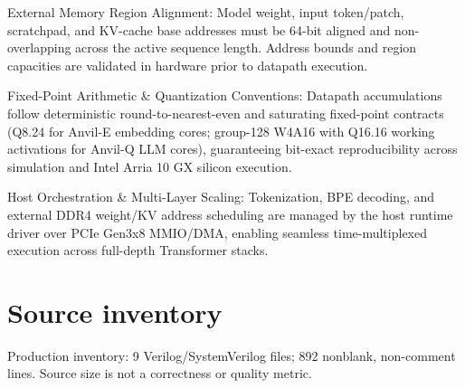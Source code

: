 \documentclass[11pt,a4paper]{article}
\begin{document}
External Memory Region Alignment: Model weight,\allowbreak{} input token/\allowbreak{}patch,\allowbreak{} scratchpad,\allowbreak{} and KV-cache base addresses must be 64-bit aligned and non-overlapping across the active sequence length. Address bounds and region capacities are validated in hardware prior to datapath execution.


Fixed-Point Arithmetic \& Quantization Conventions: Datapath accumulations follow deterministic round-to-nearest-even and saturating fixed-point contracts (\allowbreak{}Q8.24 for Anvil-E embedding cores; group-128 W4A16 with Q16.16 working activations for Anvil-Q LLM cores)\allowbreak{},\allowbreak{} guaranteeing bit-exact reproducibility across simulation and Intel Arria 10 GX silicon execution.


Host Orchestration \& Multi-Layer Scaling: Tokenization,\allowbreak{} BPE decoding,\allowbreak{} and external DDR4 weight/\allowbreak{}KV address scheduling are managed by the host runtime driver over PCIe Gen3x8 MMIO/\allowbreak{}DMA,\allowbreak{} enabling seamless time-multiplexed execution across full-depth Transformer stacks.


\appendix{}\section{Source inventory}

Production inventory: 9 Verilog/\allowbreak{}SystemVerilog files; 892 nonblank,\allowbreak{} non-comment lines. Source size is not a correctness or quality metric.
\end{document}
